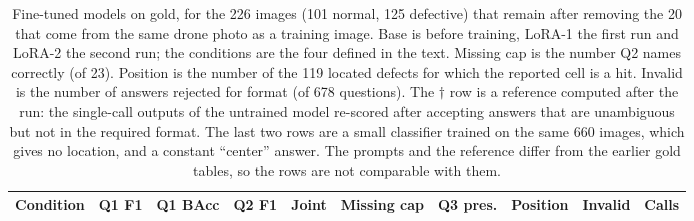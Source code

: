 \documentclass[11pt]{article}
\begin{document}
\begin{table}[t]
\centering
\caption{Fine-tuned models on gold, for the 226 images (101 normal, 125 defective) that remain after removing the 20 that come from the same drone photo as a training image. Base is before training, LoRA-1 the first run and LoRA-2 the second run; the conditions are the four defined in the text. Missing cap is the number Q2 names correctly (of 23). Position is the number of the 119 located defects for which the reported cell is a hit. Invalid is the number of answers rejected for format (of 678 questions). The $\dagger$ row is a reference computed after the run: the single-call outputs of the untrained model re-scored after accepting answers that are unambiguous but not in the required format. The last two rows are a small classifier trained on the same 660 images, which gives no location, and a constant ``center'' answer. The prompts and the reference differ from the earlier gold tables, so the rows are not comparable with them.}
\label{tab:sftgold}
\small
\begin{tabular}{lrrrrrrrrr}
\toprule
Condition & Q1 F1 & Q1 BAcc & Q2 F1 & Joint & Missing cap & Q3 pres. & Position & Invalid & Calls \\
\midrule

\bottomrule
\end{tabular}
\end{table}
\end{document}
